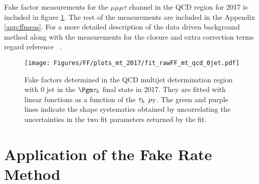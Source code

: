Fake factor measurements for the $\mu\mu\mu\tau$ channel in the QCD region for 2017 is included in figure \ref{fig:fit_raw_mt_0jet_qcd}. 
The rest of the measurements are included in the Appendix \ref{app:ffmeas}. For a more detailed description of the data driven background method along with the measurements for the closure and extra correction terms regard reference ~\cite{AN16355}.




\begin{figure}[ht!b]
\centering
\texttt{[image: Figures/FF/plots\_mt\_2017/fit\_rawFF\_mt\_qcd\_0jet.pdf]}\\
\caption{\label{fig:fit_raw_mt_0jet_qcd} Fake factors determined in the QCD multijet determination region with 0 jet in the $\Pgm\tauh$ final state in 2017. They are fitted with linear functions as a function of the $\tau_h$ $p_{\mathrm{T}}$. The green and purple lines indicate the shape systematics obtained by uncorrelating the uncertainties in the two fit parameters returned by the fit.  }
\end{figure}





\clearpage

\section{Application of the Fake Rate Method}

